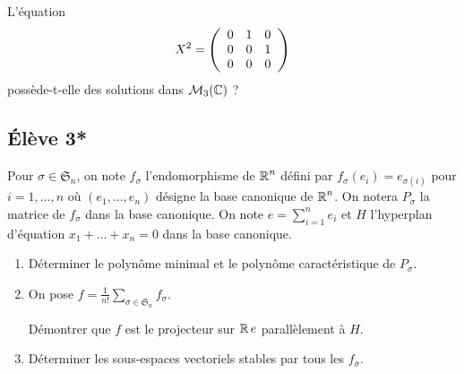 \documentclass[10pt]{scrartcl}
\begin{document}
    \begin{exo}
        L'équation 
        \[
            X^2=\left(\begin{array}{c c c} 0 & 1 & 0\\ 0 & 0 & 1\\ 0 & 0 & 0\end{array}\right)
        \]
        possède-t-elle des solutions dans $\mathcal M_3(\operatorname{\mathbb C})$ ? 
    \end{exo}

    \subsection*{Élève 3*}
    \begin{exo}
        Pour $\sigma\in\mathfrak S_n$, on note $f_\sigma$ l'endomorphisme de $\operatorname{\mathbb R}^n$ 
        défini par $f_\sigma(e_i)=e_{\sigma(i)}$ pour $i=1,\dots,n$ où $(e_1,\dots,e_n)$
        désigne la base canonique de $\operatorname{\mathbb R}^n$.
        On notera $P_\sigma$ la matrice de $f_\sigma$ dans la base canonique.
        On note $e=\sum_{i=1}^ne_i$ et $H$ l'hyperplan d'équation $x_1+\dots+x_n=0$ 
        dans la base canonique. 
        \begin{enumerate}
            \item Déterminer le polynôme minimal et le polynôme caractéristique de 
            $P_\sigma$.
            \item On pose $f=\frac1{n!}\sum_{\sigma\in\mathfrak S_n}f_\sigma$. 
            
            Démontrer que $f$ est le projecteur sur $\operatorname{\mathbb R} e$ parallèlement à $H$. 
            \item Déterminer les sous-espaces vectoriels stables par tous les 
            $f_\sigma$.
        \end{enumerate}
    \end{exo}
\end{document}

